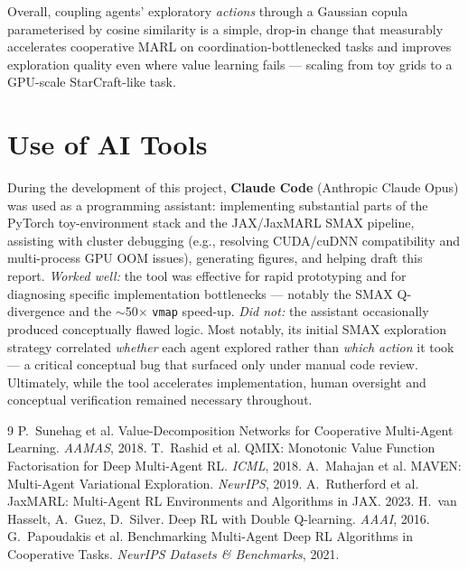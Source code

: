 \documentclass[10pt,twocolumn]{article}
\begin{document}
Overall, coupling agents' exploratory \emph{actions} through a Gaussian copula
parameterised by cosine similarity is a simple, drop-in change that measurably
accelerates cooperative MARL on coordination-bottlenecked tasks and improves
exploration quality even where value learning fails --- scaling from toy grids to
a GPU-scale StarCraft-like task.

\section*{Use of AI Tools}
\small
During the development of this project, \textbf{Claude Code} (Anthropic Claude
Opus) was used as a programming assistant: implementing substantial parts of the
PyTorch toy-environment stack and the JAX/JaxMARL SMAX pipeline, assisting with
cluster debugging (e.g., resolving CUDA/cuDNN compatibility and multi-process GPU
OOM issues), generating figures, and helping draft this report.
\emph{Worked well:} the tool was effective for rapid prototyping and for
diagnosing specific implementation bottlenecks --- notably the SMAX Q-divergence
and the $\sim$50$\times$ \texttt{vmap} speed-up.
\emph{Did not:} the assistant occasionally produced conceptually flawed logic.
Most notably, its initial SMAX exploration strategy correlated \emph{whether}
each agent explored rather than \emph{which action} it took --- a critical
conceptual bug that surfaced only under manual code review. Ultimately, while the
tool accelerates implementation, human oversight and conceptual verification
remained necessary throughout.

\begin{thebibliography}{9}
\small
{} P.~Sunehag et al. Value-Decomposition Networks for Cooperative
Multi-Agent Learning. \emph{AAMAS}, 2018.
 T.~Rashid et al. QMIX: Monotonic Value Function Factorisation for
Deep Multi-Agent RL. \emph{ICML}, 2018.
 A.~Mahajan et al. MAVEN: Multi-Agent Variational Exploration.
\emph{NeurIPS}, 2019.
 A.~Rutherford et al. JaxMARL: Multi-Agent RL Environments and
Algorithms in JAX. 2023.
 H.~van Hasselt, A.~Guez, D.~Silver. Deep RL with Double
Q-learning. \emph{AAAI}, 2016.
 G.~Papoudakis et al. Benchmarking Multi-Agent Deep RL Algorithms in
Cooperative Tasks. \emph{NeurIPS Datasets \& Benchmarks}, 2021.
\end{thebibliography}
\end{document}
